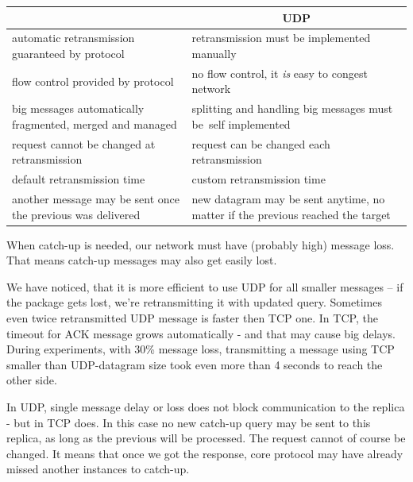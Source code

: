 \begin{center}
\small
\begin{tabular}{|>{\raggedleft\hspace{0pt}}m{}|m{}|}
\hline
\multicolumn{1}{|c|}{ \textbf{TCP} }& \multicolumn{1}{c|}{ \textbf{UDP} } \\ \hline\hline
automatic retransmission guaranteed by protocol &
                                retransmission must be implemented manually \\ \hline
flow control provided by protocol & no flow control, it \emph{is} easy to congest network \\ \hline
big messages automatically fragmented, mer\-ged and managed &
                                splitting and handling big messages must be~self implemented \\ \hline\hline

request cannot be changed at retransmission &
                                request can be changed each retransmission \\ \hline
default retransmission time & custom retransmission time \\ \hline
another message may be sent once the previous was delivered &
                                new datagram may be sent anytime, no matter if the previous reached the target \\
\hline
\end{tabular}
\end{center}

When catch-up is needed,  our network must have (probably high) message loss. That means catch-up messages may also get easily lost.

We have noticed, that it is more efficient to use UDP for all smaller messages -- if the package gets lost, we're retransmitting it with updated query. Sometimes even twice retransmitted UDP message is faster then TCP one. In TCP, the timeout for ACK message grows automatically - and that may cause big delays. During experiments, with 30\% message loss, transmitting a message using TCP smaller than UDP-datagram size took even more than 4 seconds to reach the other side.

In UDP, single message delay or loss does not block communication to the replica - but in TCP does.
In this case no new catch-up query may be sent to this replica, as long as the previous will be processed. The request cannot of course be changed. It means that once we got the response, core protocol may have already missed another instances to catch-up.

